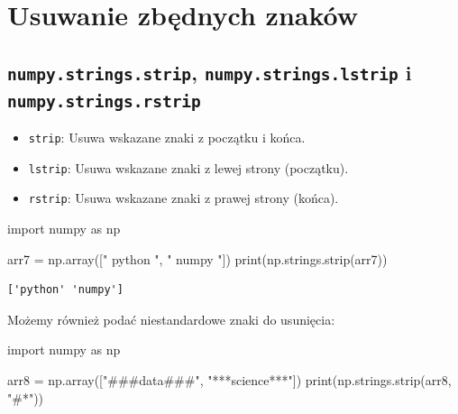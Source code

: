 \documentclass[
  polish,
  letterpaper,
  DIV=11,
  numbers=noendperiod]{scrreprt}
\newenvironment{Shaded}{\begin{snugshade}}{\end{snugshade}}
\newcommand{\BuiltInTok}[1]{\textcolor[rgb]{0.00,0.23,0.31}{#1}}
\newcommand{\ImportTok}[1]{\textcolor[rgb]{0.00,0.46,0.62}{#1}}
\newcommand{\NormalTok}[1]{\textcolor[rgb]{0.00,0.23,0.31}{#1}}
\newcommand{\OperatorTok}[1]{\textcolor[rgb]{0.37,0.37,0.37}{#1}}
\newcommand{\StringTok}[1]{\textcolor[rgb]{0.13,0.47,0.30}{#1}}
\providecommand{\tightlist}{%
  \setlength{\itemsep}{0pt}\setlength{\parskip}{0pt}}
\begin{document}
\section{Usuwanie zbędnych
znaków}\label{usuwanie-zbux119dnych-znakuxf3w}

\subsection{\texorpdfstring{\texttt{numpy.strings.strip},
\texttt{numpy.strings.lstrip} i
\texttt{numpy.strings.rstrip}}{numpy.strings.strip, numpy.strings.lstrip i numpy.strings.rstrip}}\label{numpy.strings.strip-numpy.strings.lstrip-i-numpy.strings.rstrip}

\begin{itemize}
\tightlist
\item
  \texttt{strip}: Usuwa wskazane znaki z początku i końca.
\item
  \texttt{lstrip}: Usuwa wskazane znaki z lewej strony (początku).
\item
  \texttt{rstrip}: Usuwa wskazane znaki z prawej strony (końca).
\end{itemize}

\begin{Shaded}
\begin{Highlighting}[]
\ImportTok{import}\NormalTok{ numpy }\ImportTok{as}\NormalTok{ np}

\NormalTok{arr7 }\OperatorTok{=}\NormalTok{ np.array([}\StringTok{"   python   "}\NormalTok{, }\StringTok{"  numpy  "}\NormalTok{])}
\BuiltInTok{print}\NormalTok{(np.strings.strip(arr7))}
\end{Highlighting}
\end{Shaded}

\begin{verbatim}
['python' 'numpy']
\end{verbatim}

Możemy również podać niestandardowe znaki do usunięcia:

\begin{Shaded}
\begin{Highlighting}[]
\ImportTok{import}\NormalTok{ numpy }\ImportTok{as}\NormalTok{ np}

\NormalTok{arr8 }\OperatorTok{=}\NormalTok{ np.array([}\StringTok{"\#\#\#data\#\#\#"}\NormalTok{, }\StringTok{"***science***"}\NormalTok{])}
\BuiltInTok{print}\NormalTok{(np.strings.strip(arr8, }\StringTok{"\#*"}\NormalTok{))}
\end{Highlighting}
\end{Shaded}
\end{document}
